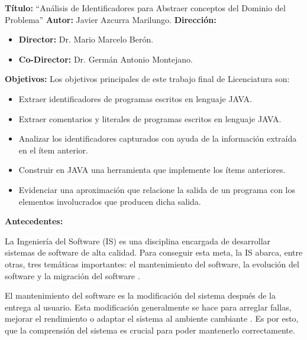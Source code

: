 \documentclass[a4paper,12pt]{report}
\begin{document}
{\Large \textbf{Título:}} “Análisis de Identificadores para Abstraer conceptos del Dominio del \mbox{Problema”}
\vskip0.5cm
{\Large \textbf{Autor:}} Javier Azcurra Marilungo.
\vskip0.5cm
{\Large \textbf{Dirección:}}
\begin{itemize}
\itemsep0em%
\item \textbf{Director:} Dr. Mario Marcelo Berón.

\item \textbf{Co-Director:} Dr. Germán Antonio Montejano.
\end{itemize}

{\Large \textbf{Objetivos:}} Los objetivos principales de este trabajo final de Licenciatura son:

\begin{itemize}
\itemsep0em%

\item Extraer identificadores de programas escritos en lenguaje JAVA.

\item Extraer comentarios y literales de programas escritos en lenguaje JAVA.

\item Analizar los identificadores capturados con ayuda de la información extraída en el ítem anterior.

\item Construir en JAVA una herramienta que implemente los ítems anteriores.

\item Evidenciar una aproximación que relacione la salida de un programa con los elementos involucrados que producen dicha salida.

\end{itemize}
{\Large \textbf{Antecedentes:}}
\vskip0.5cm

\hspace{0.5cm} La Ingeniería del Software (IS) es una disciplina encargada de desarrollar sistemas de software de alta calidad. Para conseguir esta meta, la IS abarca, entre otras, tres temáticas importantes: el mantenimiento del software, la evolución del software y la migración del software \cite{RSPMGH02}.

\hspace{0.5cm} El mantenimiento del software \cite{PFT02} es la modificación del sistema después de la entrega al usuario. Esta modificación generalmente se hace para arreglar fallas, mejorar el rendimiento o adaptar el sistema al ambiente cambiante \cite{STD610}. Es por esto, que la comprensión del sistema es crucial para poder mantenerlo correctamente.
\end{document}
